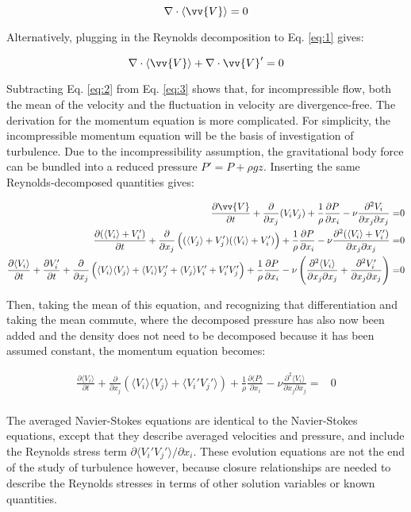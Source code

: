 \documentclass[10pt]{article}
\newcommand{\beq}{\begin{equation}}
\newcommand{\eeq}{\end{equation}}
\newcommand{\beqa}{\begin{equation}\begin{aligned}}
\newcommand{\eeqa}{\end{aligned}\end{equation}}
\newcommand{\la}{\langle}
\newcommand{\ra}{\rangle}
\begin{document}
\begin{flushleft}
\beq
\label{eq:2}
\nabla\cdot\la\vv{V}\ra=0
\eeq

Alternatively, plugging in the Reynolds decomposition to Eq. \eqref{eq:1} gives:

\beq
\label{eq:3}
\nabla\cdot\la\vv{V}\ra+\nabla\cdot\vv{V}'=0
\eeq

Subtracting Eq. \eqref{eq:2} from Eq. \eqref{eq:3} shows that, for incompressible flow, both the mean of the velocity and the fluctuation in velocity are divergence-free. The derivation for the momentum equation is more complicated. For simplicity, the incompressible momentum equation will be the basis of investigation of turbulence. Due to the incompressibility assumption, the gravitational body force can be bundled into a reduced pressure \(P'=P+\rho gz\). Inserting the same Reynolds-decomposed quantities gives:

\beqa
\frac{\partial \vv{V}}{\partial t}+\frac{\partial}{\partial x_j}(V_iV_j)+\frac{1}{\rho}\frac{\partial P}{\partial x_i}-\nu\frac{\partial^2 V_i}{\partial x_j\partial x_j}=&0\\
\frac{\partial (\la V_i\ra+V_i')}{\partial t}+\frac{\partial}{\partial x_j}\left((\la V_j\ra+V_j')(\la V_i\ra+V_i')\right)+\frac{1}{\rho}\frac{\partial P}{\partial x_i}-\nu\frac{\partial^2 (\la V_i\ra+V_i')}{\partial x_j\partial x_j}=&0\\
\frac{\partial \la V_i\ra}{\partial t}+\frac{\partial V_i'}{\partial t}+\frac{\partial}{\partial x_j}\left(\la V_i\ra\la V_j\ra+\la V_i\ra V_j'+\la V_j\ra V_i'+V_i'V_j'\right)+\frac{1}{\rho}\frac{\partial P}{\partial x_i}-\nu\left(\frac{\partial^2 \la V_i\ra}{\partial x_j\partial x_j}+\frac{\partial^2 V_i'}{\partial x_j\partial x_j}\right)=&0\\
\eeqa

Then, taking the mean of this equation, and recognizing that differentiation and taking the mean commute, where the decomposed pressure has also now been added and the density does not need to be decomposed because it has been assumed constant, the momentum equation becomes:

\beqa
\label{eq:AveNS}
\frac{\partial \la V_i\ra}{\partial t}+\frac{\partial}{\partial x_j}\left(\la V_i\ra\la V_j\ra+\la V_i'V_j'\ra\right)+\frac{1}{\rho}\frac{\partial \la P\ra}{\partial x_i}-\nu\frac{\partial^2 \la V_i\ra}{\partial x_j\partial x_j}=&0\\
\eeqa

The averaged Navier-Stokes equations are identical to the Navier-Stokes equations, except that they describe averaged velocities and pressure, and include the Reynolds stress term \(\partial\la V_i'V_j'\ra/\partial x_i\). These evolution equations are not the end of the study of turbulence however, because closure relationships are needed to describe the Reynolds stresses in terms of other solution variables or known quantities. 


\end{flushleft}
\end{document}
